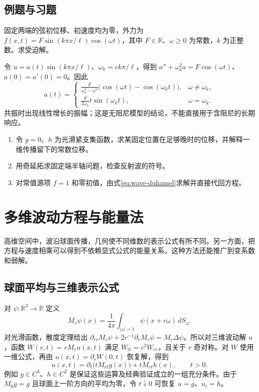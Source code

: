 \documentclass[UTF8,12pt,a4paper,fontset=fandol]{ctexbook}
\begin{document}
\section{例题与习题}
\begin{example}
固定两端的弦初位移、初速度均为零，外力为 $f(x,t)=F\sin(k\pi x/\ell)\cos(\omega t)$，其中 $F\in\mathbb R$、$\omega\ge0$ 为常数，$k$ 为正整数。求受迫解。
\end{example}
\begin{solve}
令 $u=a(t)\sin(k\pi x/\ell)$、$\omega_k=ck\pi/\ell$，得到 $a''+\omega_k^2a=F\cos(\omega t)$、$a(0)=a'(0)=0$。因此
\[
 a(t)=\begin{cases}
 \displaystyle\frac{F}{\omega_k^2-\omega^2}\bigl(\cos(\omega t)-\cos(\omega_kt)\bigr),&\omega\ne\omega_k,\\
 \displaystyle\frac{F}{2\omega_k}t\sin(\omega_kt),&\omega=\omega_k.
 \end{cases}
\]
共振时出现线性增长的振幅；这是无阻尼模型的结论，不能直接用于含阻尼的长期响应。
\end{solve}
\begin{enumerate}
 \item 令 $g=0$、$h$ 为光滑紧支集函数，求某固定位置在足够晚时的位移，并解释一维传播留下的常数位移。
 \item 用奇延拓求固定端半轴问题，检查反射波的符号。
 \item 对常值源项 $f=1$ 和零初值，由式\eqref{eq:wave-duhamel}求解并直接代回方程。
\end{enumerate}

\chapter{多维波动方程与能量法}
\label{chap:wave-multi}

高维空间中，波沿球面传播，几何使不同维数的表示公式有所不同。另一方面，把方程与速度相乘可以得到不依赖显式公式的能量关系，这种方法还能推广到变系数和弱解。

\section{球面平均与三维表示公式}
对 $\psi:\mathbb R^3\to\mathbb R$ 定义
\[
 M_r\psi(x)=\frac1{4\pi}\int_{|\omega|=1}\psi(x+r\omega)\,dS_\omega.
\]
对光滑函数，散度定理给出 $\partial_{rr}M_r\psi+2r^{-1}\partial_rM_r\psi=M_r\Delta\psi$。所以对三维波动解 $u$，函数 $W(r,t)=rM_ru(x,t)$ 满足 $W_{tt}=c^2W_{rr}$，且关于 $r$ 奇对称。对 $W$ 使用一维公式，再由 $u(x,t)=\partial_rW(0,t)$ 恢复解，得到
\begin{equation}
 u(x,t)=\partial_t\bigl(tM_{ct}g(x)\bigr)+tM_{ct}h(x),\qquad t>0.
 \label{eq:kirchhoff}
\end{equation}
例如 $g\in C^3$、$h\in C^2$ 是保证这些运算及经典验证成立的一组充分条件。由于 $M_0g=g$ 且球面上一阶方向的平均为零，令 $t\downarrow0$ 可恢复 $u=g$、$u_t=h$。
\end{document}

